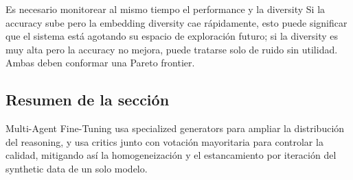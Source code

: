 


\begin{knowledgebox}{Es necesario monitorear al mismo tiempo el performance y la diversity}
Si la accuracy sube pero la embedding diversity cae rápidamente, esto puede significar que el sistema está agotando su espacio de exploración futuro; si la diversity es muy alta pero la accuracy no mejora, puede tratarse solo de ruido sin utilidad. Ambas deben conformar una Pareto frontier.
\end{knowledgebox}

\subsection{Resumen de la sección}

Multi-Agent Fine-Tuning usa specialized generators para ampliar la distribución del reasoning, y usa critics junto con votación mayoritaria para controlar la calidad, mitigando así la homogeneización y el estancamiento por iteración del synthetic data de un solo modelo.
